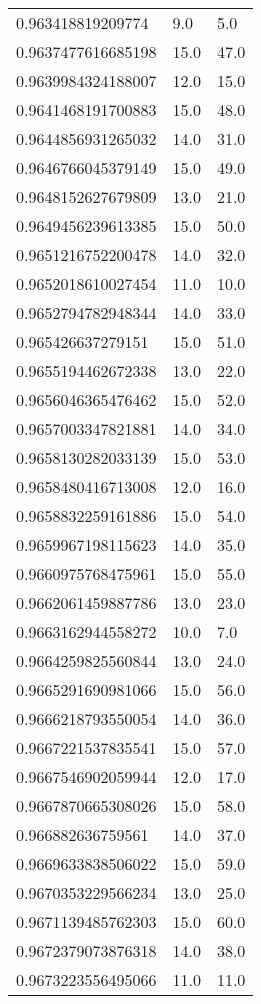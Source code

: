 \begin{center}
\begin{supertabular}[H]{p{0.30\textwidth}p{0.05\textwidth}p{0.05\textwidth}}
0.963418819209774 & 9.0 & 5.0 \\ 
0.9637477616685198 & 15.0 & 47.0 \\ 
0.9639984324188007 & 12.0 & 15.0 \\ 
0.9641468191700883 & 15.0 & 48.0 \\ 
0.9644856931265032 & 14.0 & 31.0 \\ 
0.9646766045379149 & 15.0 & 49.0 \\ 
0.9648152627679809 & 13.0 & 21.0 \\ 
0.9649456239613385 & 15.0 & 50.0 \\ 
0.9651216752200478 & 14.0 & 32.0 \\ 
0.9652018610027454 & 11.0 & 10.0 \\ 
0.9652794782948344 & 14.0 & 33.0 \\ 
0.965426637279151 & 15.0 & 51.0 \\ 
0.9655194462672338 & 13.0 & 22.0 \\ 
0.9656046365476462 & 15.0 & 52.0 \\ 
0.9657003347821881 & 14.0 & 34.0 \\ 
0.9658130282033139 & 15.0 & 53.0 \\ 
0.9658480416713008 & 12.0 & 16.0 \\ 
0.9658832259161886 & 15.0 & 54.0 \\ 
0.9659967198115623 & 14.0 & 35.0 \\ 
0.9660975768475961 & 15.0 & 55.0 \\ 
0.9662061459887786 & 13.0 & 23.0 \\ 
0.9663162944558272 & 10.0 & 7.0 \\ 
0.9664259825560844 & 13.0 & 24.0 \\ 
0.9665291690981066 & 15.0 & 56.0 \\ 
0.9666218793550054 & 14.0 & 36.0 \\ 
0.9667221537835541 & 15.0 & 57.0 \\ 
0.9667546902059944 & 12.0 & 17.0 \\ 
0.9667870665308026 & 15.0 & 58.0 \\ 
0.966882636759561 & 14.0 & 37.0 \\ 
0.9669633838506022 & 15.0 & 59.0 \\ 
0.9670353229566234 & 13.0 & 25.0 \\ 
0.9671139485762303 & 15.0 & 60.0 \\ 
0.9672379073876318 & 14.0 & 38.0 \\ 
0.9673223556495066 & 11.0 & 11.0 \\ 

\end{supertabular}
\end{center}
